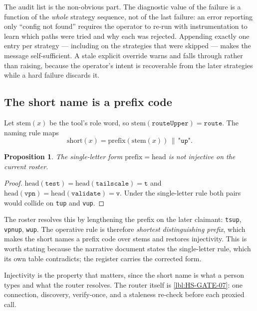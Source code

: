 \documentclass[11pt]{article}
\newtheorem{prop}{Proposition}[section]
\begin{document}
The audit list is the non-obvious part. The diagnostic value of the failure is
a function of the \emph{whole} strategy sequence, not of the last failure: an
error reporting only ``config not found'' requires the operator to re-run with
instrumentation to learn which paths were tried and why each was rejected.
Appending exactly one entry per strategy --- including on the strategies that
were skipped --- makes the message self-sufficient. A stale explicit override
warns and falls through rather than raising, because the operator's intent is
recoverable from the later strategies while a hard failure discards it.

\subsection{The short name is a prefix code}
\label{lbl:HS-BOUND-06}

Let $\mathrm{stem}(x)$ be the tool's role word, so
$\mathrm{stem}(\texttt{routeUpper}) = \texttt{route}$. The naming rule maps
\begin{equation}
\mathrm{short}(x) = \mathrm{prefix}(\mathrm{stem}(x)) \,\|\, \texttt{"up"} .
\end{equation}

\begin{prop}
The single-letter form $\mathrm{prefix} = \mathrm{head}$ is \emph{not}
injective on the current roster.
\end{prop}

\begin{proof}
$\mathrm{head}(\texttt{test}) = \mathrm{head}(\texttt{tailscale}) = \texttt{t}$
and $\mathrm{head}(\texttt{vpn}) = \mathrm{head}(\texttt{validate}) =
\texttt{v}$. Under the single-letter rule both pairs would collide on
\texttt{tup} and \texttt{vup}.
\end{proof}

The roster resolves this by lengthening the prefix on the later claimant:
\texttt{tsup}, \texttt{vpnup}, \texttt{wup}. The operative rule is therefore
\emph{shortest distinguishing prefix}, which makes the short names a prefix
code over stems and restores injectivity. This is worth stating because the
narrative document states the single-letter rule, which its own table
contradicts; the register carries the corrected form.

Injectivity is the property that matters, since the short name is what a
person types and what the router resolves. The router itself is
\ref{lbl:HS-GATE-07}: one connection, discovery, verify-once, and a staleness
re-check before each proxied call.
\end{document}
